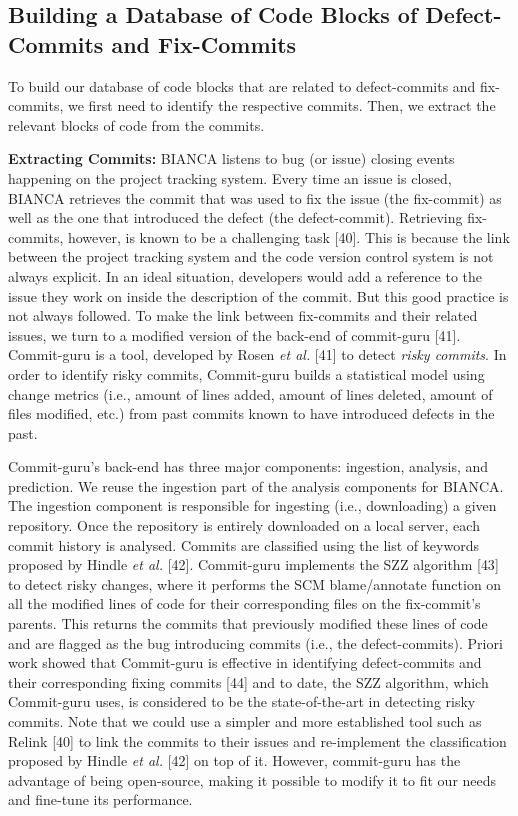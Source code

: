 \documentclass[conference]{IEEEtran}
\begin{document}
\subsection{Building a Database of Code Blocks of Defect-Commits and
Fix-Commits}\label{sec:offline}

To build our database of code blocks that are related to defect-commits
and fix-commits, we first need to identify the respective commits. Then,
we extract the relevant blocks of code from the commits.

\textbf{Extracting Commits:} BIANCA listens to bug (or issue) closing
events happening on the project tracking system. Every time an issue is
closed, BIANCA retrieves the commit that was used to fix the issue (the
fix-commit) as well as the one that introduced the defect (the
defect-commit). Retrieving fix-commits, however, is known to be a
challenging task {[}40{]}. This is because the link between the project
tracking system and the code version control system is not always
explicit. In an ideal situation, developers would add a reference to the
issue they work on inside the description of the commit. But this good
practice is not always followed. To make the link between fix-commits
and their related issues, we turn to a modified version of the back-end
of commit-guru {[}41{]}. Commit-guru is a tool, developed by Rosen
\emph{et al.} {[}41{]} to detect \emph{risky commits}. In order to
identify risky commits, Commit-guru builds a statistical model using
change metrics (i.e., amount of lines added, amount of lines deleted,
amount of files modified, etc.) from past commits known to have
introduced defects in the past.

Commit-guru's back-end has three major components: ingestion, analysis,
and prediction. We reuse the ingestion part of the analysis components
for BIANCA. The ingestion component is responsible for ingesting (i.e.,
downloading) a given repository. Once the repository is entirely
downloaded on a local server, each commit history is analysed. Commits
are classified using the list of keywords proposed by Hindle \emph{et
al.} {[}42{]}. Commit-guru implements the SZZ algorithm {[}43{]} to
detect risky changes, where it performs the SCM blame/annotate function
on all the modified lines of code for their corresponding files on the
fix-commit's parents. This returns the commits that previously modified
these lines of code and are flagged as the bug introducing commits
(i.e., the defect-commits). Priori work showed that Commit-guru is
effective in identifying defect-commits and their corresponding fixing
commits {[}44{]} and to date, the SZZ algorithm, which Commit-guru uses,
is considered to be the state-of-the-art in detecting risky commits.
Note that we could use a simpler and more established tool such as
Relink {[}40{]} to link the commits to their issues and re-implement the
classification proposed by Hindle \emph{et al.} {[}42{]} on top of it.
However, commit-guru has the advantage of being open-source, making it
possible to modify it to fit our needs and fine-tune its performance.
\end{document}
